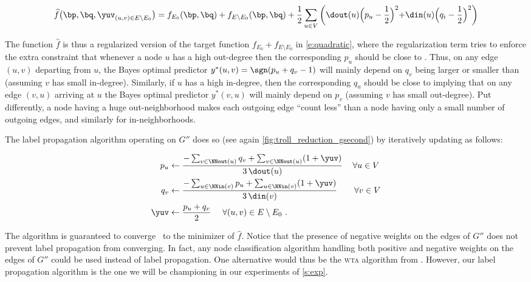 \begin{equation*}
{\widehat f}\big(\bp,\bq,{\yuv}_{(u,v) \in E\setminus E_0}\big)
= f_{E_0}(\bp,\bq) + f_{E\setminus E_0}(\bp,\bq)
+ \frac{1}{2}\sum_{u\in V}
\left(\dout(u)\Bigl(p_u-\frac{1}{2}\Bigl)^2+\din(u)\Bigl(q_i-\frac{1}{2}\Bigl)^2\right)
\end{equation*}

The function ${\widehat f}$ is thus a regularized version of the target function $f_{E_0} +
f_{E\setminus E_0}$ in \eqref{e:quadratic}, where the regularization term tries to enforce the extra
constraint that whenever a node $u$ has a high out-degree then the corresponding $p_u$ should be
close to \shalf. Thus, on any edge $(u,v)$ departing from $u$, the Bayes optimal predictor $y^*(u,v)
= \sgn(p_u+q_v-1)$ will mainly depend on $q_v$ being larger or smaller than \shalf{} (assuming $v$
has small in-degree). Similarly, if $u$ has a high in-degree, then the corresponding $q_u$ should be
close to \shalf{} implying that on any edge $(v,u)$ arriving at $u$ the Bayes optimal predictor
$y^*(v,u)$ will mainly depend on $p_v$ (assuming $v$ has small out-degree). Put differently, a node
having a huge out-neighborhood makes each outgoing edge \enquote{count less} than a node having only
a small number of outgoing edges, and similarly for in-neighborhoods.

The label propagation algorithm operating on $G''$ does so (see again
\autoref{fig:troll_reduction_gsecond}) by iteratively updating as follows:

\begin{align*}
  p_{u}  & \leftarrow \frac{-\sum_{v \in \NNout(u)} q_{v} + \sum_{v \in \NNout(u)} (1+\yuv)}{3\,\dout(u)}\,\quad\forall u\in V\\
  q_{v}  & \leftarrow \frac{-\sum_{u \in  \NNin(v)} p_{u} + \sum_{u \in \NNin(v) } (1+\yuv)}{3\,\din(v)}\qquad\forall v \in V\\
  \yuv & \leftarrow \frac{p_u + q_v}{2}~ \quad \forall (u,v) \in E\setminus E_0~.
\end{align*}

The algorithm is guaranteed to converge~\autocite{LabelPropa03} to the minimizer of ${\widehat f}$.
Notice that the presence of negative weights on the edges of $G''$ does not prevent label
propagation from converging. In fact, any node classification algorithm handling both positive and
negative weights on the edges of $G''$ could be used instead of label propagation. One alternative
would thus be the \textsc{wta} algorithm from \autocite{WTA13}. However, our label propagation
algorithm is the one we will be championing in our experiments of \autoref{s:exp}.
